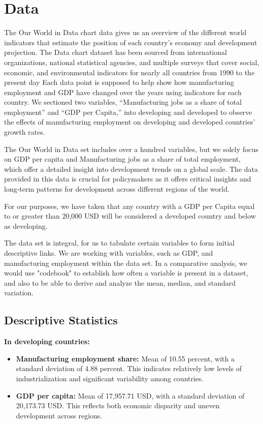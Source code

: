 \documentclass[12pt]{article}
\begin{document}
\section{Data}
\label{sec:data}


The Our World in Data chart data gives us an overview of the different world indicators that estimate the position of each country's economy and development projection. The Data chart dataset has been sourced from international organizations, national statistical agencies, and multiple surveys that cover social, economic, and environmental indicators for nearly all countries from 1990 to the present day Each data point is supposed to help show how manufacturing employment and GDP have changed over the years using indicators for each country. We sectioned two variables, ``Manufacturing jobs as a share of total employment'' and ``GDP per Capita,'' into developing and developed to observe the effects of manufacturing employment on developing and developed countries' growth rates.

The Our World in Data set includes over a hundred variables, but we solely focus on GDP per capita and Manufacturing jobs as a share of total employment, which offer a detailed insight into development trends on a global scale. The data provided in this data is crucial for policymakers as it offers critical insights and long-term patterns for development across different regions of the world.

For our purposes, we have taken that any country with a GDP per Capita equal to or greater than 20,000 USD will be considered a developed country and below as developing. 


The data set is integral, for us to tabulate certain variables to form initial descriptive links. We are working with variables, such as GDP, and manufacturing employment within the data set. In a comparative analysis, we would use "codebook" to establish how often a variable is present in a dataset, and also to be able to derive and analyze the mean, median, and standard variation.

\subsection{Descriptive Statistics}

\textbf{In developing countries:}
\begin{itemize}
\item \textbf{Manufacturing employment share:} Mean of 10.55 percent, with a standard deviation of 4.88 percent. This indicates relatively low levels of industrialization and significant variability among countries.
\item \textbf{GDP per capita:} Mean of 17,957.71 USD, with a standard deviation of 20,173.73 USD. This reflects both economic disparity and uneven development across regions.
\end{itemize}
\end{document}
